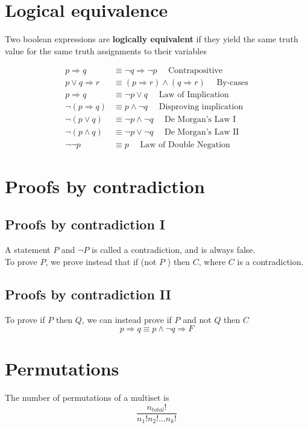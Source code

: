 \section{Logical equivalence}

Two boolean expressions are \textbf{logically equivalent} if they yield the same truth value for the same truth assignments to their variables

\begin{align*}
   p \Rightarrow q & \equiv \lnot q \Rightarrow \lnot p \quad \text{ Contrapositive} \\
   p \lor q \Rightarrow r &\equiv (p \Rightarrow r) \land (q \Rightarrow r) \quad \text{ By-cases} \\
   p \Rightarrow q & \equiv \lnot p \lor q \quad\text{ Law of Implication} \\
   \lnot (p \Rightarrow q) & \equiv p \land \lnot q \quad\text{ Disproving implication} \\
   \lnot (p \lor q) & \equiv \lnot p \land \lnot q \quad\text{ De Morgan's Law I} \\
   \lnot (p \land q) & \equiv \lnot p \lor \lnot q \quad\text{ De Morgan's Law II} \\
   \lnot \lnot p & \equiv p \quad \text{ Law of Double Negation}
\end{align*}

\section{Proofs by contradiction}

\subsection{Proofs by contradiction I}
\begin{framed}
A statement $P$ and  $\lnot P$ is called a contradiction, and is always false. \\ 

To prove $P$, we prove instead that  if (not $P$ ) then $C$, where $C $ is a contradiction.
\end{framed}

\subsection{Proofs by contradiction II}

\begin{framed}
To prove if $P$ then $Q$, we can instead prove if  $P$ and not $Q$ then $C$
\[
  p \Rightarrow q \equiv p \land \lnot q \Rightarrow F
\] 
\end{framed}
\section{Permutations}


The number of permutations of a multiset is
\[
   \frac{n_{total}!}{n_1! n_2! \hdots n_k!}
\] 



